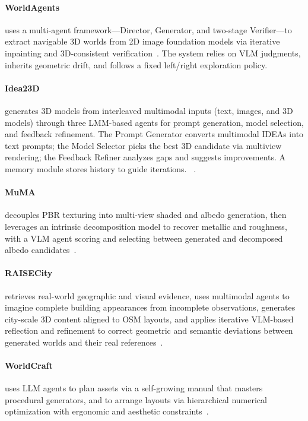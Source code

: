 \paragraph{WorldAgents}
 uses a multi-agent framework—Director, Generator, and two-stage Verifier—to extract navigable 3D worlds from 2D image foundation models via iterative inpainting and 3D-consistent verification~\cite{avg260319708}. The system relies on VLM judgments, inherits geometric drift, and follows a fixed left/right exploration policy.

\paragraph{Idea23D} generates 3D models from interleaved multimodal inputs (text, images, and 3D models) through three LMM-based agents for prompt generation, model selection, and feedback refinement. The Prompt Generator converts multimodal IDEAs into text prompts; the Model Selector picks the best 3D candidate via multiview rendering; the Feedback Refiner analyzes gaps and suggests improvements. A memory module stores history to guide iterations. ~\cite{avg240404363}.

\paragraph{MuMA} decouples PBR texturing into multi-view shaded and albedo generation, then leverages an intrinsic decomposition model to recover metallic and roughness, with a VLM agent scoring and selecting between generated and decomposed albedo candidates~\cite{avg250318461}.

\paragraph{RAISECity} retrieves real-world geographic and visual evidence, uses multimodal agents to imagine complete building appearances from incomplete observations, generates city-scale 3D content aligned to OSM layouts, and applies iterative VLM-based reflection and refinement to correct geometric and semantic deviations between generated worlds and their real references~\cite{avg251118005}.

\paragraph{WorldCraft} uses LLM agents to plan assets via a self-growing manual that masters procedural generators, and to arrange layouts via hierarchical numerical optimization with ergonomic and aesthetic constraints~\cite{avg250215601}.

